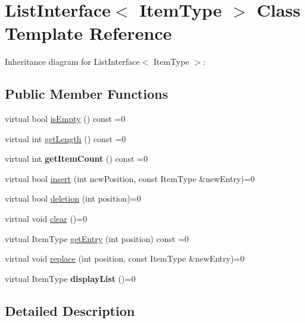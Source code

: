 \hypertarget{classListInterface}{}\section{List\+Interface$<$ Item\+Type $>$ Class Template Reference}
\label{classListInterface}


Inheritance diagram for List\+Interface$<$ Item\+Type $>$\+:
\subsection*{Public Member Functions}
\begin{DoxyCompactItemize}
\item 
virtual bool \hyperlink{classListInterface_a924f91e7f81d7dcd3fda79bbcc671394}{is\+Empty} () const =0
\item 
virtual int \hyperlink{classListInterface_afc85695d4137f1e29ff02e179c9f3221}{get\+Length} () const =0
\item 
\mbox{\label{classListInterface_a3e085e6ea9c5dc3e8007010cd889159c}} 
virtual int {\bfseries get\+Item\+Count} () const =0
\item 
virtual bool \hyperlink{classListInterface_a5b2f86954a86172699a3495982c38e77}{insert} (int new\+Position, const Item\+Type \&new\+Entry)=0
\item 
virtual bool \hyperlink{classListInterface_a68520ce2942ec716c745b1137c50a3c6}{deletion} (int position)=0
\item 
virtual void \hyperlink{classListInterface_adfda414908b645bdf19bcab8269168b7}{clear} ()=0
\item 
virtual Item\+Type \hyperlink{classListInterface_a86987f69e5056d287212ede41db1956a}{get\+Entry} (int position) const =0
\item 
virtual void \hyperlink{classListInterface_aae877a56b7b9f5f526c37a00e234fad1}{replace} (int position, const Item\+Type \&new\+Entry)=0
\item 
\mbox{\label{classListInterface_a2f2f533e962dd89111ee50b972dc28e7}} 
virtual Item\+Type {\bfseries display\+List} ()=0
\end{DoxyCompactItemize}


\subsection{Detailed Description}
